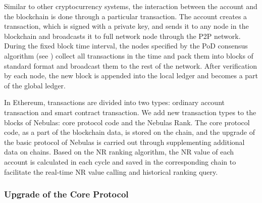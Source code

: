 Similar to other cryptocurrency systems, the interaction between the account and the blockchain is done through a particular transaction. The account creates a transaction, which is signed with a private key, and sends it to any node in the blockchain and broadcasts it to full network node through the P2P network. During the fixed block time interval, the nodes specified by the PoD consensus algorithm (see ) collect all transactions in the time and pack them into blocks of standard format and broadcast them to the rest of the network. After verification by each node, the new block is appended into the local ledger and becomes a part of the global ledger.


In Ethereum, transactions are divided into two types: ordinary account transaction and smart contract transaction. We add new transaction types to the blocks of Nebulas: core protocol code and the Nebulas Rank. The core protocol code, as a part of the blockchain data, is stored on the chain, and the upgrade of the basic protocol of Nebulas is carried out through supplementing additional data on chains. Based on the NR ranking algorithm, the NR value of each account is calculated in each cycle and saved in the corresponding chain to facilitate the real-time NR value calling and historical ranking query.


\subsubsection{Upgrade of the Core Protocol}

